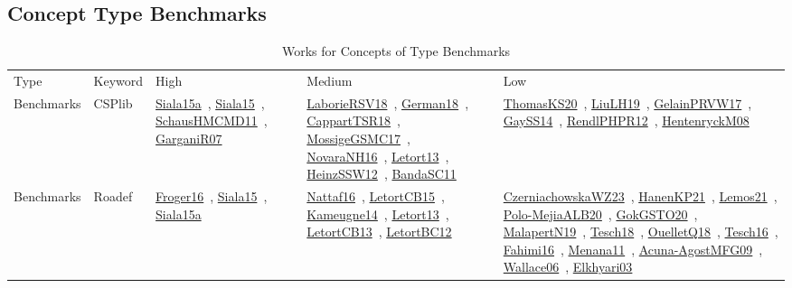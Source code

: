 \clearpage
\subsection{Concept Type Benchmarks}
\label{sec:Benchmarks}
{\scriptsize
\begin{longtable}{lp{3cm}>{\raggedright\arraybackslash}p{6cm}>{\raggedright\arraybackslash}p{6cm}>{\raggedright\arraybackslash}p{8cm}}
\rowcolor{white}\caption{Works for Concepts of Type Benchmarks}\\ \toprule
\rowcolor{white}Type & Keyword & High & Medium & Low\\ \midrule\endhead
\bottomrule
\endfoot
Benchmarks & CSPlib & \href{../works/Siala15a.pdf}{Siala15a}~\cite{Siala15a}, \href{../works/Siala15.pdf}{Siala15}~\cite{Siala15}, \href{../works/SchausHMCMD11.pdf}{SchausHMCMD11}~\cite{SchausHMCMD11}, \href{../works/GarganiR07.pdf}{GarganiR07}~\cite{GarganiR07} & \href{../works/LaborieRSV18.pdf}{LaborieRSV18}~\cite{LaborieRSV18}, \href{../works/German18.pdf}{German18}~\cite{German18}, \href{../works/CappartTSR18.pdf}{CappartTSR18}~\cite{CappartTSR18}, \href{../works/MossigeGSMC17.pdf}{MossigeGSMC17}~\cite{MossigeGSMC17}, \href{../works/NovaraNH16.pdf}{NovaraNH16}~\cite{NovaraNH16}, \href{../works/Letort13.pdf}{Letort13}~\cite{Letort13}, \href{../works/HeinzSSW12.pdf}{HeinzSSW12}~\cite{HeinzSSW12}, \href{../works/BandaSC11.pdf}{BandaSC11}~\cite{BandaSC11} & \href{../works/ThomasKS20.pdf}{ThomasKS20}~\cite{ThomasKS20}, \href{../works/LiuLH19.pdf}{LiuLH19}~\cite{LiuLH19}, \href{../works/GelainPRVW17.pdf}{GelainPRVW17}~\cite{GelainPRVW17}, \href{../works/GaySS14.pdf}{GaySS14}~\cite{GaySS14}, \href{../works/RendlPHPR12.pdf}{RendlPHPR12}~\cite{RendlPHPR12}, \href{../works/HentenryckM08.pdf}{HentenryckM08}~\cite{HentenryckM08}\\
Benchmarks & Roadef & \href{../works/Froger16.pdf}{Froger16}~\cite{Froger16}, \href{../works/Siala15.pdf}{Siala15}~\cite{Siala15}, \href{../works/Siala15a.pdf}{Siala15a}~\cite{Siala15a} & \href{../works/Nattaf16.pdf}{Nattaf16}~\cite{Nattaf16}, \href{../works/LetortCB15.pdf}{LetortCB15}~\cite{LetortCB15}, \href{../works/Kameugne14.pdf}{Kameugne14}~\cite{Kameugne14}, \href{../works/Letort13.pdf}{Letort13}~\cite{Letort13}, \href{../works/LetortCB13.pdf}{LetortCB13}~\cite{LetortCB13}, \href{../works/LetortBC12.pdf}{LetortBC12}~\cite{LetortBC12} & \href{../works/CzerniachowskaWZ23.pdf}{CzerniachowskaWZ23}~\cite{CzerniachowskaWZ23}, \href{../works/HanenKP21.pdf}{HanenKP21}~\cite{HanenKP21}, \href{../works/Lemos21.pdf}{Lemos21}~\cite{Lemos21}, \href{../works/Polo-MejiaALB20.pdf}{Polo-MejiaALB20}~\cite{Polo-MejiaALB20}, \href{../works/GokGSTO20.pdf}{GokGSTO20}~\cite{GokGSTO20}, \href{../works/MalapertN19.pdf}{MalapertN19}~\cite{MalapertN19}, \href{../works/Tesch18.pdf}{Tesch18}~\cite{Tesch18}, \href{../works/OuelletQ18.pdf}{OuelletQ18}~\cite{OuelletQ18}, \href{../works/Tesch16.pdf}{Tesch16}~\cite{Tesch16}, \href{../works/Fahimi16.pdf}{Fahimi16}~\cite{Fahimi16}, \href{../works/Menana11.pdf}{Menana11}~\cite{Menana11}, \href{../works/Acuna-AgostMFG09.pdf}{Acuna-AgostMFG09}~\cite{Acuna-AgostMFG09}, \href{../works/Wallace06.pdf}{Wallace06}~\cite{Wallace06}, \href{../works/Elkhyari03.pdf}{Elkhyari03}~\cite{Elkhyari03}\\

\end{longtable}}
